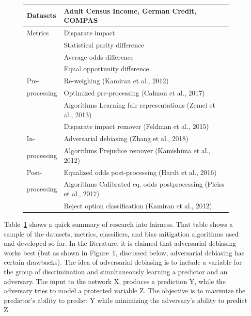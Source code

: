 \documentclass{NSF}
\newcommand{\tbl}[1]{Table~\ref{tbl:#1}}
\begin{document}
\begin{nsfdescription}
\begin{figure}
\begin{center}
\begin{tabular}{p{0.6in}|p{3.9in}}
   \rowcolor{blue!10} Datasets & Adult Census Income, German Credit, COMPAS\\
    \hline
    Metrics&Disparate impact\\
    &Statistical parity difference\\
    &Average odds difference\\
    &Equal opportunity difference\\
    \hline
    \rowcolor{blue!10}Pre-  & Re-weighing (Kamiran et al., 2012) \cite{Kamiran2012}\\
    \rowcolor{blue!10} processing& Optimized pre-processing (Calmon et al., 2017) \cite{NIPS2017_6988} \\
   \rowcolor{blue!10}  & Algorithms Learning fair representations (Zemel et al., 2013) \cite{pmlr-v28-zemel13}\\
    \rowcolor{blue!10} & Disparate impact remover (Feldman et al., 2015) \cite{Feldman:2015:CRD:2783258.2783311}\\
    \hline
   In-     & Adversarial debiasing (Zhang et al., 2018) \cite{Zhang:2018:MUB:3278721.3278779}\\
    processing& Algorithms Prejudice remover (Kamishima et al., 2012) \cite{Kamishima}\\
    \hline
   \rowcolor{blue!10}  Post-   & Equalized odds post-processing (Hardt et al., 2016) \cite{Hardt}\\
    \rowcolor{blue!10}processing & Algorithms Calibrated eq. odds postprocessing (Pleiss et al., 2017) \cite{NIPS2017_7151}\\
   \rowcolor{blue!10}  & Reject option classification (Kamiran et al., 2012) \cite{Kamiran:2018:ERO:3165328.3165686}\\
   
\end{tabular}
\end{center} 
\label{tbl:multicol}
\end{figure}
 
 \tbl{multicol} shows a  quick summary of research into fairness. That table shows a sample of  the datasets, metrics, classifiers, and bias mitigation algorithms used and developed so far. In the literature, it is claimed that
adversarial debiasing works best\cite{Zhang:2018:MUB:3278721.3278779} (but as shown in Figure~1, discussed below, adversarial debiasing has certain drawbacks). The idea of adversarial debiasing is to include a variable for the group of discrimination and simultaneously learning a predictor and an adversary. The input to the network X, produces a prediction Y, while the adversary tries to model a protected variable Z. The objective is to maximize the predictor's ability to predict Y while minimizing the adversary's ability to predict Z. 


\end{nsfdescription}
\end{document}
